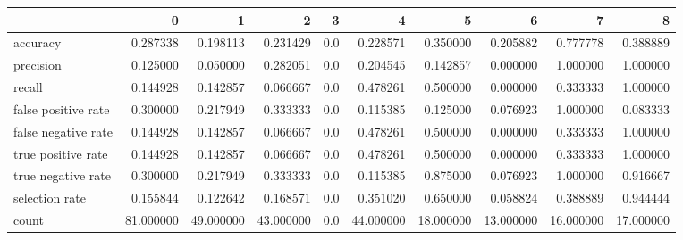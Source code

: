 \begin{tabular}{lrrrrrrrrr}
\toprule
{} &          0 &          1 &          2 &    3 &          4 &          5 &          6 &          7 &          8 \\
\midrule
accuracy            &   0.287338 &   0.198113 &   0.231429 &  0.0 &   0.228571 &   0.350000 &   0.205882 &   0.777778 &   0.388889 \\
precision           &   0.125000 &   0.050000 &   0.282051 &  0.0 &   0.204545 &   0.142857 &   0.000000 &   1.000000 &   1.000000 \\
recall              &   0.144928 &   0.142857 &   0.066667 &  0.0 &   0.478261 &   0.500000 &   0.000000 &   0.333333 &   1.000000 \\
false positive rate &   0.300000 &   0.217949 &   0.333333 &  0.0 &   0.115385 &   0.125000 &   0.076923 &   1.000000 &   0.083333 \\
false negative rate &   0.144928 &   0.142857 &   0.066667 &  0.0 &   0.478261 &   0.500000 &   0.000000 &   0.333333 &   1.000000 \\
true positive rate  &   0.144928 &   0.142857 &   0.066667 &  0.0 &   0.478261 &   0.500000 &   0.000000 &   0.333333 &   1.000000 \\
true negative rate  &   0.300000 &   0.217949 &   0.333333 &  0.0 &   0.115385 &   0.875000 &   0.076923 &   1.000000 &   0.916667 \\
selection rate      &   0.155844 &   0.122642 &   0.168571 &  0.0 &   0.351020 &   0.650000 &   0.058824 &   0.388889 &   0.944444 \\
count               &  81.000000 &  49.000000 &  43.000000 &  0.0 &  44.000000 &  18.000000 &  13.000000 &  16.000000 &  17.000000 \\
\bottomrule
\end{tabular}
